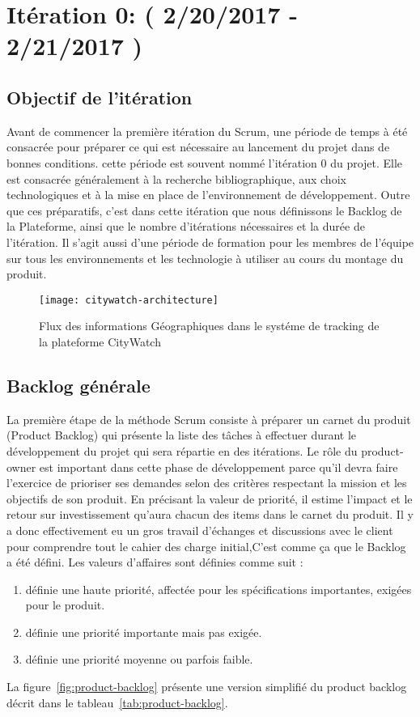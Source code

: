 \section{Itération 0: ( 2/20/2017 - 2/21/2017 )}

\subsection{Objectif de l'itération }

Avant de commencer la première itération du Scrum, une période de temps à été
consacrée pour préparer ce qui est nécessaire au lancement du projet dans de bonnes
conditions. cette période est souvent nommé l'itération 0 du projet. Elle est consacrée
généralement à la recherche bibliographique, aux choix technologiques et à la mise en
place de l'environnement de développement. Outre que ces préparatifs, c'est dans cette
itération que nous définissons le Backlog de la Plateforme, ainsi que le nombre
d'itérations nécessaires et la durée de l'itération. Il s'agit aussi d'une période de
formation pour les membres de l'équipe sur tous les environnements et les technologie à
utiliser au cours du montage du produit.

\begin{figure}[htbp]
  \centering
  \texttt{[image: citywatch-architecture]}
  \caption[Flux des information Géographiques en CityWatch]
  {Flux des informations Géographiques dans le systéme de tracking de la plateforme CityWatch}
  \label{fig:citywatch-architecture}
\end{figure}

\subsection{Backlog générale}

La première étape de la méthode Scrum consiste à préparer un carnet du produit
(Product Backlog) qui présente la liste des tâches à effectuer durant le développement
du projet qui sera répartie en des itérations. Le rôle du product-owner est important
dans cette phase de développement parce qu'il devra faire l'exercice de prioriser ses
demandes selon des critères respectant la mission et les objectifs de son produit. En
précisant la valeur de priorité, il estime l'impact et le retour sur investissement 
qu'aura chacun des items dans le carnet du produit.
Il y a donc effectivement eu un gros travail
d'échanges et discussions avec le client pour comprendre tout le cahier des charge
initial,C'est comme ça que le Backlog a été défini.
Les valeurs d'affaires sont définies comme suit :
\begin{enumerate}
\item définie une haute priorité, affectée pour les spécifications importantes,
exigées pour le produit.
\item définie une priorité importante mais pas exigée.
\item  définie une priorité moyenne ou parfois faible.
\end{enumerate}
La figure~\ref{fig:product-backlog} présente une version simplifié du product
backlog décrit dans le tableau~\ref{tab:product-backlog}.


